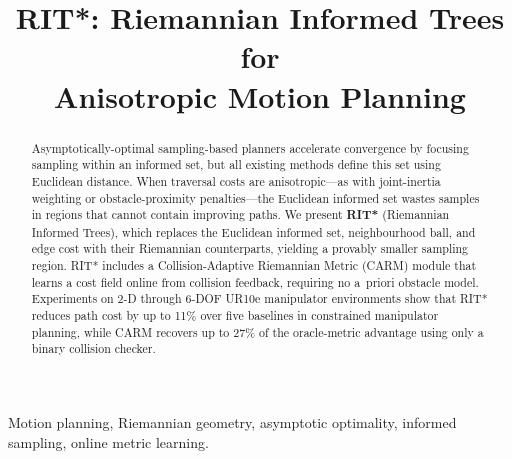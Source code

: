 \documentclass[journal]{IEEEtran}
\begin{document}
\title{RIT*: Riemannian Informed Trees for\\Anisotropic Motion Planning}

\author{
}


\maketitle

\begin{abstract}
Asymptotically-optimal sampling-based planners accelerate convergence
by focusing sampling within an informed set, but all existing methods
define this set using Euclidean distance.
When traversal costs are anisotropic---as with joint-inertia weighting
or obstacle-proximity penalties---the Euclidean informed set wastes
samples in regions that cannot contain improving paths.
We present \textbf{RIT*} (Riemannian Informed Trees), which replaces
the Euclidean informed set, neighbourhood ball, and edge cost with
their Riemannian counterparts, yielding a provably smaller sampling
region.
RIT* includes a Collision-Adaptive Riemannian Metric (CARM) module
that learns a cost field online from collision feedback, requiring no
a~priori obstacle model.
Experiments on 2-D through 6-DOF UR10e manipulator environments show
that RIT* reduces path cost by up to 11\% over five baselines in
constrained manipulator planning, while CARM recovers up to 27\%
of the oracle-metric advantage using only a binary collision checker.
\end{abstract}

\begin{IEEEkeywords}
Motion planning, Riemannian geometry, asymptotic optimality,
informed sampling, online metric learning.
\end{IEEEkeywords}
\end{document}
